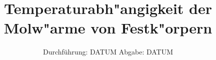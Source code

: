 

\subject{VERSUCH NUMMER 47}
\title{Temperaturabh"angigkeit der Molw"arme von Festk"orpern}
\date{
  Durchführung: DATUM
  \hspace{3em}
  Abgabe: DATUM
}



\maketitle
\newpage






\printbibliography


